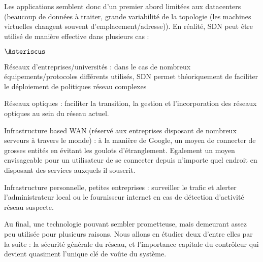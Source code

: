 Les applications semblent donc d'un premier abord limitées aux datacenters (beaucoup de données à traiter, grande variabilité de la topologie (les machines virtuelles changent souvent d'emplacement/adresse)). En réalité, SDN peut être utilisé de manière effective dans plusieurs cas :

\begin{list}{$\Asteriscus$}{}
\item Réseaux d'entreprises/universités : dans le cas de nombreux équipements/protocoles différents utilisés, SDN permet théoriquement de faciliter le déploiement de politiques réseau complexes
\item Réseaux optiques : faciliter la transition, la gestion et l'incorporation des réseaux optiques au sein du réseau actuel.
\item Infrastructure based WAN (réservé aux entreprises disposant de nombreux serveurs à travers le monde) : à la manière de Google, un moyen de connecter de grosses entités en évitant les goulots d'étranglement. Egalement un moyen envisageable pour un utilisateur de se connecter depuis n'importe quel endroit en disposant des services auxquels il souscrit.
\item Infrastructure personnelle, petites entreprises : surveiller le trafic et alerter l'administrateur local ou le fournisseur internet en cas de détection d'activité réseau suspecte.\\
\end{list}

Au final, une technologie pouvant sembler prometteuse, mais demeurant assez peu utilisée pour plusieurs raisons. Nous allons en étudier deux d'entre elles par la suite : la sécurité générale du réseau, et l'importance capitale du contrôleur qui devient quasiment l'unique clé de voûte du système.